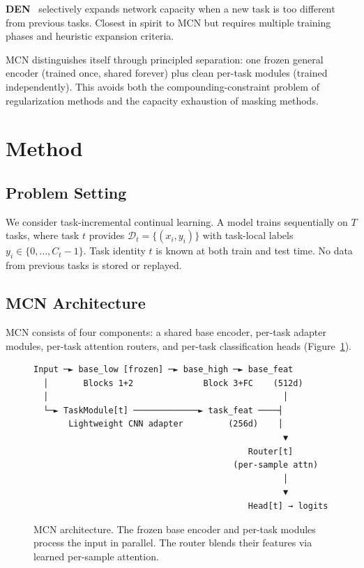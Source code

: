 \documentclass[10pt,twocolumn]{article}
\begin{document}
\textbf{DEN}~\cite{den2018} selectively expands network capacity when a new task is too different from previous tasks. Closest in spirit to MCN but requires multiple training phases and heuristic expansion criteria.

MCN distinguishes itself through principled separation: one frozen general encoder (trained once, shared forever) plus clean per-task modules (trained independently). This avoids both the compounding-constraint problem of regularization methods and the capacity exhaustion of masking methods.

\section{Method}

\subsection{Problem Setting}

We consider task-incremental continual learning. A model trains sequentially on $T$ tasks, where task $t$ provides $\mathcal{D}_t = \{(x_i, y_i)\}$ with task-local labels $y_i \in \{0, \ldots, C_t - 1\}$. Task identity $t$ is known at both train and test time. No data from previous tasks is stored or replayed.

\subsection{MCN Architecture}

MCN consists of four components: a shared base encoder, per-task adapter modules, per-task attention routers, and per-task classification heads (Figure~\ref{fig:arch}).

\begin{figure}[h]
\centering
\small
\begin{verbatim}
Input ─► base_low [frozen] ─► base_high ─► base_feat
  │       Blocks 1+2              Block 3+FC    (512d)
  │                                               │
  └─► TaskModule[t] ─────────────► task_feat ────┤
       Lightweight CNN adapter         (256d)    │
                                                  ▼
                                           Router[t]
                                        (per-sample attn)
                                                  │
                                                  ▼
                                           Head[t] → logits
\end{verbatim}
\caption{MCN architecture. The frozen base encoder and per-task modules process the input in parallel. The router blends their features via learned per-sample attention.}
\label{fig:arch}
\end{figure}
\end{document}
